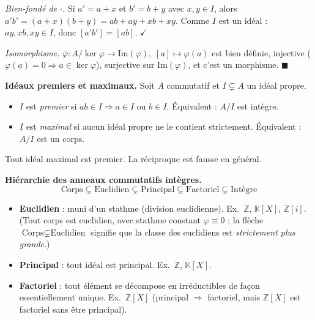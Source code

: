 \begin{mdframed}[style=proofbar]
  \textit{Bien-fondé de $\cdot$.}
  Si $a' = a + x$ et $b' = b + y$ avec $x, y \in I$, alors
  $a'b' = (a+x)(b+y) = ab + ay + xb + xy$.
  Comme $I$ est un idéal : $ay, xb, xy \in I$, donc $[a'b'] = [ab]$. $\checkmark$

  \textit{Isomorphisme.}
  $\bar\varphi : A/\ker\varphi \to \mathrm{Im}(\varphi),\; [a] \mapsto \varphi(a)$
  est bien définie, injective ($\varphi(a)=0 \Rightarrow a \in \ker\varphi$),
  surjective sur $\mathrm{Im}(\varphi)$, et c'est un morphisme. \hfill$\blacksquare$
\end{mdframed}

\decsep{}


\begin{tcolorbox}[thmbox]
  \textbf{Idéaux premiers et maximaux.}\enspace%
  Soit $A$ commutatif et $I \subsetneq A$ un idéal propre.
  \begin{itemize}
    \item $I$ est \emph{premier} si $ab \in I \Rightarrow a \in I$ ou $b \in I$.
          Équivalent : $A/I$ est intègre.
    \item $I$ est \emph{maximal} si aucun idéal propre ne le contient strictement.
          Équivalent : $A/I$ est un corps.
  \end{itemize}
  Tout idéal maximal est premier. La réciproque est fausse en général.
\end{tcolorbox}

\begin{tcolorbox}[thmbox]
  \textbf{Hiérarchie des anneaux commutatifs intègres.}
  \[
    \text{Corps} \subsetneq \text{Euclidien} \subsetneq \text{Principal}
    \subsetneq \text{Factoriel} \subsetneq \text{Intègre}
  \]
  \begin{itemize}
    \item \textbf{Euclidien} : muni d'un stathme (division euclidienne).
          Ex.\ $\mathbb{Z}$, $\mathbb{K}[X]$, $\mathbb{Z}[i]$.
          (Tout corps est euclidien, avec stathme constant $\varphi \equiv 0$ ;
          la flèche $\text{Corps}\subsetneq\text{Euclidien}$ signifie que la
          classe des euclidiens est \emph{strictement plus grande}.)
    \item \textbf{Principal} : tout idéal est principal.
          Ex.\ $\mathbb{Z}$, $\mathbb{K}[X]$.
    \item \textbf{Factoriel} : tout élément se décompose
          en irréductibles de façon essentiellement unique.
          Ex.\ $\mathbb{Z}[X]$ (principal $\Rightarrow$ factoriel, mais $\mathbb{Z}[X]$
          est factoriel sans être principal).
  \end{itemize}
\end{tcolorbox}

